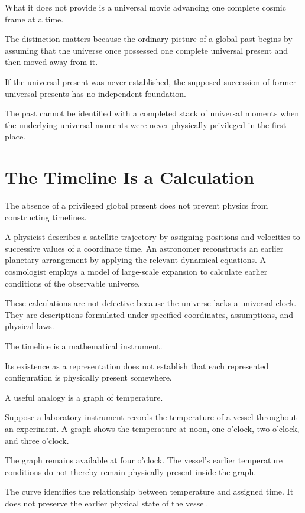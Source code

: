 \documentclass[12pt,onecolumn]{article}
\begin{document}
What it does not provide is a universal movie advancing one complete cosmic frame at a time.

The distinction matters because the ordinary picture of a global past begins by assuming that the universe once possessed one complete universal present and then moved away from it.

If the universal present was never established, the supposed succession of former universal presents has no independent foundation.

The past cannot be identified with a completed stack of universal moments when the underlying universal moments were never physically privileged in the first place.

\section{The Timeline Is a Calculation}

The absence of a privileged global present does not prevent physics from constructing timelines.

A physicist describes a satellite trajectory by assigning positions and velocities to successive values of a coordinate time. An astronomer reconstructs an earlier planetary arrangement by applying the relevant dynamical equations. A cosmologist employs a model of large-scale expansion to calculate earlier conditions of the observable universe.

These calculations are not defective because the universe lacks a universal clock. They are descriptions formulated under specified coordinates, assumptions, and physical laws.

The timeline is a mathematical instrument.

Its existence as a representation does not establish that each represented configuration is physically present somewhere.

A useful analogy is a graph of temperature.

Suppose a laboratory instrument records the temperature of a vessel throughout an experiment. A graph shows the temperature at noon, one o'clock, two o'clock, and three o'clock.

The graph remains available at four o'clock. The vessel's earlier temperature conditions do not thereby remain physically present inside the graph.

The curve identifies the relationship between temperature and assigned time. It does not preserve the earlier physical state of the vessel.
\end{document}
